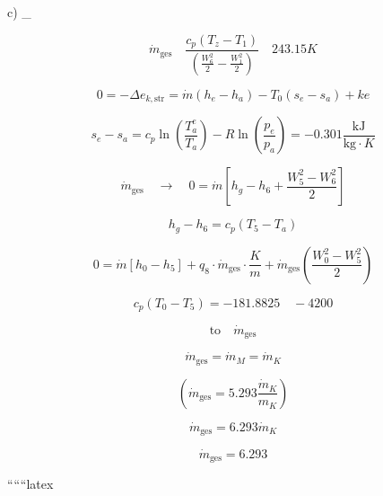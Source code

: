 c) \quad {}_{}

\[
\dot{m}_{\text{ges}} \quad \frac{c_p (T_{z} - T_{1})}{\left( \frac{W_{6}^{2}}{2} - \frac{W_{1}^{2}}{2} \right)} \quad 243.15K
\]

\[
0 = -\Delta e_{k,\text{str}} = \dot{m} (h_{e} - h_{a}) - T_{0} (s_{e} - s_{a}) + ke
\]

\[
s_{e} - s_{a} = c_p \ln \left( \frac{T_{a}^{e}}{T_{a}} \right) - R \ln \left( \frac{p_{e}}{p_{a}} \right) = -0.301 \frac{\text{kJ}}{\text{kg} \cdot K}
\]

\[
\dot{m}_{\text{ges}} \quad \rightarrow \quad 0 = \dot{m} \left[ h_{g} - h_{6} + \frac{W_{5}^{2} - W_{6}^{2}}{2} \right]
\]

\[
h_{g} - h_{6} = c_p (T_{5} - T_{a})
\]

\[
0 = \dot{m} \left[ h_{0} - h_{5} \right] + q_{8} \cdot \dot{m}_{\text{ges}} \cdot \frac{K}{m} + \dot{m}_{\text{ges}} \left( \frac{W_{0}^{2} - W_{5}^{2}}{2} \right)
\]

\[
c_p (T_{0} - T_{5}) = -181.8825 \quad -4200
\]

\[
\text{to} \quad \dot{m}_{\text{ges}}
\]

\[
\dot{m}_{\text{ges}} = \dot{m}_{M} = \dot{m}_{K}
\]

\[
(\dot{m}_{\text{ges}} = 5.293 \frac{\dot{m}_{K}}{m_{K}})
\]

\[
\dot{m}_{\text{ges}} = 6.293 \dot{m}_{K}
\]

\[
\dot{m}_{\text{ges}} = 6.293
\]

``````latex



